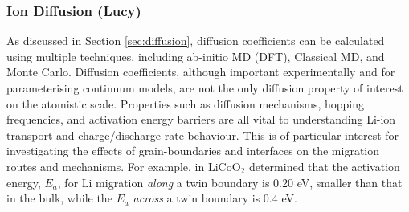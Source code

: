 \documentclass[../main.tex]{subfiles}
\begin{document}

\subsubsection{Ion Diffusion (Lucy)}
As discussed in Section \ref{sec:diffusion}, diffusion coefficients can be calculated using multiple techniques, including ab-initio MD (DFT), Classical MD, and Monte Carlo. Diffusion coefficients, although important experimentally and for parameterising continuum models, are not the only diffusion property of interest on the atomistic scale. Properties such as diffusion mechanisms, hopping frequencies, and activation energy barriers are all vital to understanding Li-ion transport and charge/discharge rate behaviour. This is of particular interest for investigating the effects of grain-boundaries and interfaces on the migration routes and mechanisms. For example, in LiCoO$_2$ \citeauthor{moriwake2013first} determined that the activation energy, $E_a$, for Li migration \textit{along} a twin boundary is 0.20 eV, smaller than that in the bulk, while the $E_a$ \textit{across} a twin boundary is 0.4 eV. \cite{moriwake2013first}
\end{document}
